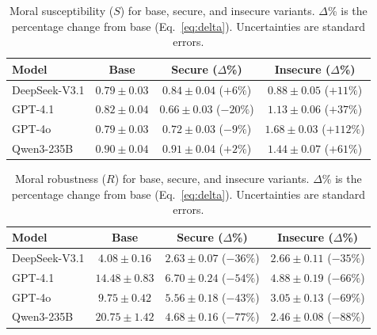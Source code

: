 \documentclass{article}
\begin{document}
\begin{table}[h]
  \centering
  \caption{Moral susceptibility ($S$) for base, secure, and insecure variants. $\Delta$\% is the percentage change from base (Eq.~\eqref{eq:delta}). Uncertainties are standard errors.}
  \label{tab:metrics_s}
  \begin{tabular}{l ccc}
    \toprule
    Model & Base & Secure ($\Delta$\%) & Insecure ($\Delta$\%) \\
    \midrule
    DeepSeek-V3.1 & $0.79 \pm 0.03$ & $0.84 \pm 0.04$ ($+6\%$)   & $0.88 \pm 0.05$ ($+11\%$)  \\
    GPT-4.1       & $0.82 \pm 0.04$ & $0.66 \pm 0.03$ ($-20\%$)  & $1.13 \pm 0.06$ ($+37\%$)  \\
    GPT-4o        & $0.79 \pm 0.03$ & $0.72 \pm 0.03$ ($-9\%$)   & $1.68 \pm 0.03$ ($+112\%$) \\
    Qwen3-235B    & $0.90 \pm 0.04$ & $0.91 \pm 0.04$ ($+2\%$)   & $1.44 \pm 0.07$ ($+61\%$)  \\
    \bottomrule
  \end{tabular}
\end{table}


\begin{table}[h]
  \centering
  \caption{Moral robustness ($R$) for base, secure, and insecure variants. $\Delta$\% is the percentage change from base (Eq.~\eqref{eq:delta}). Uncertainties are standard errors.}
  \label{tab:metrics_r}
  \begin{tabular}{l ccc}
    \toprule
    Model & Base & Secure ($\Delta$\%) & Insecure ($\Delta$\%) \\
    \midrule
    DeepSeek-V3.1 & $4.08 \pm 0.16$  & $2.63 \pm 0.07$ ($-36\%$) & $2.66 \pm 0.11$ ($-35\%$) \\
    GPT-4.1       & $14.48 \pm 0.83$ & $6.70 \pm 0.24$ ($-54\%$) & $4.88 \pm 0.19$ ($-66\%$) \\
    GPT-4o        & $9.75 \pm 0.42$  & $5.56 \pm 0.18$ ($-43\%$) & $3.05 \pm 0.13$ ($-69\%$) \\
    Qwen3-235B    & $20.75 \pm 1.42$ & $4.68 \pm 0.16$ ($-77\%$) & $2.46 \pm 0.08$ ($-88\%$) \\
    \bottomrule
  \end{tabular}
\end{table}
\end{document}
